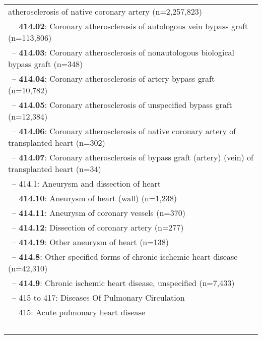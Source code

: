\begin{longtable}{p{\textwidth}}
atherosclerosis of native coronary artery (n=2,257,823)} \\ \-\ \hspace{40pt}\footnotesize{-- {\color{ForestGreen} \textbf{414.02}}: Coronary atherosclerosis of autologous vein bypass graft (n=113,806)} \\ \-\ \hspace{40pt}\footnotesize{-- {\color{ForestGreen} \textbf{414.03}}: Coronary atherosclerosis of nonautologous biological bypass graft (n=348)} \\ \-\ \hspace{40pt}\footnotesize{-- {\color{ForestGreen} \textbf{414.04}}: Coronary atherosclerosis of artery bypass graft (n=10,782)} \\ \-\ \hspace{40pt}\footnotesize{-- {\color{ForestGreen} \textbf{414.05}}: Coronary atherosclerosis of unspecified bypass graft (n=12,384)} \\ \-\ \hspace{40pt}\footnotesize{-- {\color{ForestGreen} \textbf{414.06}}: Coronary atherosclerosis of native coronary artery of transplanted heart (n=302)} \\ \-\ \hspace{40pt}\footnotesize{-- {\color{ForestGreen} \textbf{414.07}}: Coronary atherosclerosis of bypass graft (artery) (vein) of transplanted heart (n=34)} \\ \-\ \hspace{30pt}\footnotesize{-- 414.1: Aneurysm and dissection of heart} \\ \-\ \hspace{40pt}\footnotesize{-- {\color{ForestGreen} \textbf{414.10}}: Aneurysm of heart (wall) (n=1,238)} \\ \-\ \hspace{40pt}\footnotesize{-- {\color{ForestGreen} \textbf{414.11}}: Aneurysm of coronary vessels (n=370)} \\ \-\ \hspace{40pt}\footnotesize{-- {\color{ForestGreen} \textbf{414.12}}: Dissection of coronary artery (n=277)} \\ \-\ \hspace{40pt}\footnotesize{-- {\color{ForestGreen} \textbf{414.19}}: Other aneurysm of heart (n=138)} \\ \-\ \hspace{30pt}\footnotesize{-- {\color{ForestGreen} \textbf{414.8}}: Other specified forms of chronic ischemic heart disease (n=42,310)} \\ \-\ \hspace{30pt}\footnotesize{-- {\color{ForestGreen} \textbf{414.9}}: Chronic ischemic heart disease, unspecified (n=7,433)} \\ \-\ \hspace{10pt}\footnotesize{-- 415 to 417: Diseases Of Pulmonary Circulation} \\ \-\ \hspace{20pt}\footnotesize{-- 415: Acute pulmonary heart disease} \\ \-\ \hspace{30pt}\footnotesize{-- 
\end{longtable}
